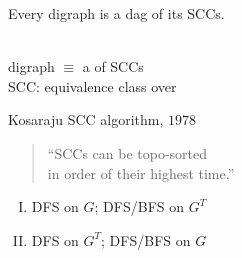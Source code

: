 
\begin{frame}{}
  \begin{theorem}
    Every digraph is a dag of its SCCs.
  \end{theorem}

  \pause
  \vspace{0.60cm}
  \begin{center}
     \\[10pt] 

    digraph $\equiv$ a  of SCCs \\[6pt]

    SCC: equivalence class over 
  \end{center}
\end{frame}
\begin{frame}{}
  \centerline{}

  \vspace{0.50cm}
  \begin{exampleblock}{Kosaraju SCC algorithm, $1978$}
    \begin{quote}
      \begin{center}
	``SCCs can be topo-sorted \\ in  order of their highest  time.''
      \end{center}
    \end{quote}

  \end{exampleblock}

  \pause
  \vspace{0.60cm}
  \begin{enumerate}[(I)]
    \centering
    \item DFS on $G$; \; DFS/BFS on $G^{T}$
    \item DFS on $G^{T}$;\; DFS/BFS on $G$
  \end{enumerate}
\end{frame}
